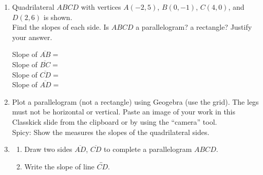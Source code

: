 \documentclass[12pt, twoside]{article}
\begin{document}
\begin{enumerate}
\newpage
\item Quadrilateral $ABCD$ with vertices $A(-2,5)$, $B(0,-1)$, $C(4,0)$, and $D(2,6)$ is shown. \\[0.5cm]
Find the slopes of each side. Is $ABCD$ a parallelogram? a rectangle? Justify your answer.
\begin{multicols}{2}
  Slope of $\overline{AB}=$\\[1.5cm]
  Slope of $\overline{BC}=$\\[1.5cm]
  Slope of $\overline{CD}=$\\[1.5cm]
  Slope of $\overline{AD}=$\\
  \begin{flushright}
    \end{flushright}
  \end{multicols}

\newpage
\item Plot a parallelogram (not a rectangle) using Geogebra (use the grid). The legs must not be horizontal or vertical. Paste an image of your work in this Classkick slide from the clipboard or by using the ``camera'' tool.\\[0.25cm]
Spicy: Show the measures the slopes of the quadrilateral sides.

  
\newpage
\item 
    \begin{enumerate}
      \item Draw two sides $\overline{AD}$, $\overline{CD}$ to complete a parallelogram $ABCD$. \vspace{0.25cm}
      \item Write the slope of line $\overleftrightarrow{CD}$.
      \begin{multicols}{2}
        

\end{multicols}
\end{enumerate}
\end{enumerate}
\end{document}
